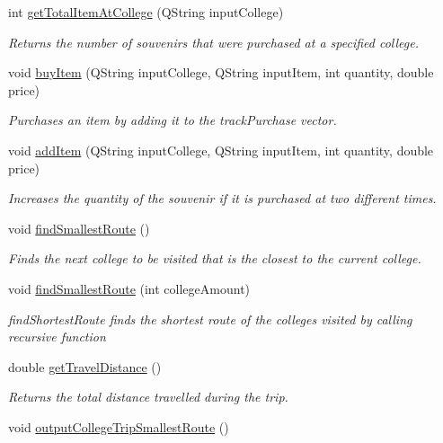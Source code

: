 \begin{DoxyCompactItemize}
int \hyperlink{class_trip_ac636b0c45604cd57feba441a07d90097}{get\+Total\+Item\+At\+College} (Q\+String input\+College)
\begin{DoxyCompactList}\small\item\em Returns the number of souvenirs that were purchased at a specified college. \end{DoxyCompactList}\item 
void \hyperlink{class_trip_a0f10513e7d48bcc2e42dd264b876af28}{buy\+Item} (Q\+String input\+College, Q\+String input\+Item, int quantity, double price)
\begin{DoxyCompactList}\small\item\em Purchases an item by adding it to the track\+Purchase vector. \end{DoxyCompactList}\item 
void \hyperlink{class_trip_a510f0eba5d6a5ddf6f24db6f6fa10239}{add\+Item} (Q\+String input\+College, Q\+String input\+Item, int quantity, double price)
\begin{DoxyCompactList}\small\item\em Increases the quantity of the souvenir if it is purchased at two different times. \end{DoxyCompactList}\item 
void \hyperlink{class_trip_a4af54ea247a8c3fae20f6042743d30e6}{find\+Smallest\+Route} ()
\begin{DoxyCompactList}\small\item\em Finds the next college to be visited that is the closest to the current college. \end{DoxyCompactList}\item 
void \hyperlink{class_trip_ac5c7c1f7e9d4c62005f6677d971a270e}{find\+Smallest\+Route} (int college\+Amount)
\begin{DoxyCompactList}\small\item\em find\+Shortest\+Route finds the shortest route of the colleges visited by calling recursive function \end{DoxyCompactList}\item 
double \hyperlink{class_trip_aafe225b87fdabb218e1ef62ec2554310}{get\+Travel\+Distance} ()
\begin{DoxyCompactList}\small\item\em Returns the total distance travelled during the trip. \end{DoxyCompactList}\item 
void \hyperlink{class_trip_a44cf30382f49a42f2f45615b14330ea8}{output\+College\+Trip\+Smallest\+Route} ()

\end{DoxyCompactItemize}
